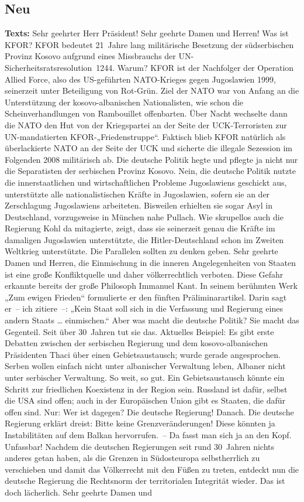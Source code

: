 \documentclass{article}
\begin{document}
\subsection{Neu}
\noindent\textbf{Texts:} Sehr geehrter Herr Präsident! Sehr geehrte Damen und Herren! Was ist KFOR? KFOR bedeutet 21 Jahre lang militärische Besetzung der südserbischen Provinz Kosovo  aufgrund eines Missbrauchs der UN-Sicherheitsratsresolution 1244.  Warum? KFOR ist der Nachfolger der Operation Allied Force, also des US-geführten NATO-Krieges gegen Jugoslawien 1999, seinerzeit unter Beteiligung von Rot-Grün.  Ziel der NATO war von Anfang an die Unterstützung der kosovo-albanischen Nationalisten, wie schon die Scheinverhandlungen von Rambouillet offenbarten. Über Nacht wechselte dann die NATO den Hut von der Kriegspartei an der Seite der UCK-Terroristen zur UN-mandatierten KFOR-„Friedenstruppe“. Faktisch blieb KFOR natürlich als überlackierte NATO an der Seite der UCK und sicherte die illegale Sezession im Folgenden 2008 militärisch ab.  Die deutsche Politik hegte und pflegte ja nicht nur die Separatisten der serbischen Provinz Kosovo. Nein, die deutsche Politik nutzte die innerstaatlichen und wirtschaftlichen Probleme Jugoslawiens geschickt aus, unterstützte alle nationalistischen Kräfte in Jugoslawien, sofern sie an der Zerschlagung Jugoslawiens arbeiteten. Bisweilen erhielten sie sogar Asyl in Deutschland, vorzugsweise in München nahe Pullach.  Wie skrupellos auch die Regierung Kohl da mitagierte, zeigt, dass sie seinerzeit genau die Kräfte im damaligen Jugoslawien unterstützte, die Hitler-Deutschland schon im Zweiten Weltkrieg unterstützte. Die Parallelen sollten zu denken geben.  Sehr geehrte Damen und Herren, die Einmischung in die inneren Angelegenheiten von Staaten ist eine große Konfliktquelle und daher völkerrechtlich verboten. Diese Gefahr erkannte bereits der große Philosoph Immanuel Kant. In seinem berühmten Werk „Zum ewigen Frieden“ formulierte er den fünften Präliminarartikel. Darin sagt er – ich zitiere –: „Kein Staat soll sich in die Verfassung und Regierung eines andern Staats … einmischen.“ Aber was macht die deutsche Politik? Sie macht das Gegenteil. Seit über 30 Jahren tut sie das. Aktuelles Beispiel: Es gibt erste Debatten zwischen der serbischen Regierung und dem kosovo-albanischen Präsidenten Thaci über einen Gebietsaustausch; wurde gerade angesprochen. Serben wollen einfach nicht unter albanischer Verwaltung leben, Albaner nicht unter serbischer Verwaltung. So weit, so gut. Ein Gebietsaustausch könnte ein Schritt zur friedlichen Koexistenz in der Region sein.  Russland ist dafür, selbst die USA sind offen; auch in der Europäischen Union gibt es Staaten, die dafür offen sind. Nur: Wer ist dagegen? Die deutsche Regierung! Danach.  Die deutsche Regierung erklärt dreist: Bitte keine Grenzveränderungen! Diese könnten ja Instabilitäten auf dem Balkan hervorrufen. – Da fasst man sich ja an den Kopf. Unfassbar! Nachdem die deutschen Regierungen seit rund 30 Jahren nichts anderes getan haben, als die Grenzen in Südosteuropa selbstherrlich zu verschieben und damit das Völkerrecht mit den Füßen zu treten, entdeckt nun die deutsche Regierung die Rechtsnorm der territorialen Integrität wieder. Das ist doch lächerlich.  Sehr geehrte Damen und 
\end{document}
